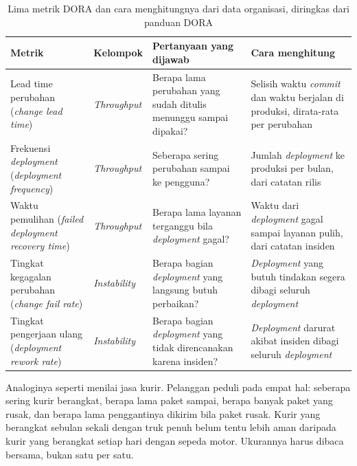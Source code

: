 \begin{table}[!htb]
  \centering
  \caption{Lima metrik DORA dan cara menghitungnya dari data organisasi, diringkas dari panduan
           DORA \cite{dora-metrics}}
  \label{tab:ch13-metrik-dora}
  \footnotesize
  \begin{tabularx}{\textwidth}{>{\raggedright\arraybackslash}p{3.0cm} >{\raggedright\arraybackslash}p{1.6cm} >{\raggedright\arraybackslash}X >{\raggedright\arraybackslash}X}
    \hline
    \textbf{Metrik} & \textbf{Kelompok} & \textbf{Pertanyaan yang dijawab} & \textbf{Cara
      menghitung} \\ \hline
    Lead time perubahan (\textit{change lead time}) & \textit{Throughput} & Berapa lama perubahan
      yang sudah ditulis menunggu sampai dipakai? & Selisih waktu \textit{commit} dan waktu
      berjalan di produksi, dirata-rata per perubahan \\ \hline
    Frekuensi \textit{deployment} (\textit{deployment frequency}) & \textit{Throughput} & Seberapa
      sering perubahan sampai ke pengguna? & Jumlah \textit{deployment} ke produksi per bulan,
      dari catatan rilis \\ \hline
    Waktu pemulihan (\textit{failed deployment recovery time}) & \textit{Throughput} & Berapa
      lama layanan terganggu bila \textit{deployment} gagal? & Waktu dari \textit{deployment}
      gagal sampai layanan pulih, dari catatan insiden \\ \hline
    Tingkat kegagalan perubahan (\textit{change fail rate}) & \textit{Instability} & Berapa bagian
      \textit{deployment} yang langsung butuh perbaikan? & \textit{Deployment} yang butuh
      tindakan segera dibagi seluruh \textit{deployment} \\ \hline
    Tingkat pengerjaan ulang (\textit{deployment rework rate}) & \textit{Instability} & Berapa
      bagian \textit{deployment} yang tidak direncanakan karena insiden? & \textit{Deployment}
      darurat akibat insiden dibagi seluruh \textit{deployment} \\ \hline
  \end{tabularx}
\end{table}

Analoginya seperti menilai jasa kurir. Pelanggan peduli pada empat hal: seberapa sering kurir
berangkat, berapa lama paket sampai, berapa banyak paket yang rusak, dan berapa lama penggantinya
dikirim bila paket rusak. Kurir yang berangkat sebulan sekali dengan truk penuh belum tentu lebih
aman daripada kurir yang berangkat setiap hari dengan sepeda motor. Ukurannya harus dibaca
bersama, bukan satu per satu.

